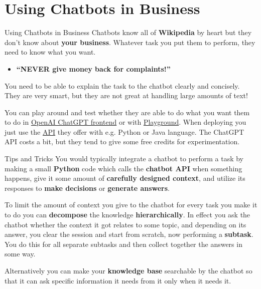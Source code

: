 \documentclass{beamer}
\begin{document}
\section{Using Chatbots in Business}
\begin{frame}{Using Chatbots in Business}
Chatbots know all of \textbf{Wikipedia} by heart but they don't know about \textbf{your business}. Whatever task you put them to perform, they need to know what you want.
  \begin{itemize}
    \item \textbf{``NEVER give money back for complaints!''}
  \end{itemize}
You need to be able to explain the task to the chatbot clearly and concisely. They are very smart, but they are not great at handling large amounts of text!

\vspace{0.5cm}

You can play around and test whether they are able to do what you want them to do in \textcolor{blue}{\href{https://chat.openai.com}{OpenAI ChatGPT frontend}} or with \textcolor{blue}{\href{https://platform.openai.com/playground?mode=chat&model=gpt-4}{Playground}}. When deploying you just use the \textcolor{blue}{\href{https://platform.openai.com/overview}{API}} they offer with e.g. Python or Java language. The ChatGPT API costs a bit, but they tend to give some free credits for experimentation.
\end{frame}

\begin{frame}{Tips and Tricks}
You would typically integrate a chatbot to perform a task by making a small \textbf{Python} code which calls the \textbf{chatbot API} when something happens, give it some amount of \textbf{carefully designed context}, and utilize its responses to \textbf{make decisions} or \textbf{generate answers}.

To limit the amount of context you give to the chatbot for every task you make it to do you can \textbf{decompose} the knowledge \textbf{hierarchically}. In effect you ask the chatbot whether the context it got relates to some topic, and depending on its answer, you clear the session and start from scratch, now performing a \textbf{subtask}. You do this for all separate subtasks and then collect together the answers in some way.

Alternatively you can make your \textbf{knowledge base} searchable by the chatbot so that it can ask specific information it needs from it only when it needs it.
\end{frame}
\end{document}
